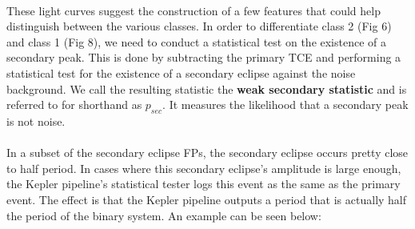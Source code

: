 \documentclass{article}
\begin{document}
\paragraph{}These light curves suggest the construction of a few features that could help distinguish between the various classes. In order to differentiate class 2 (Fig 6) and class 1 (Fig 8), we need to conduct a statistical test on the existence of a secondary peak. This is done by subtracting the primary TCE and performing a statistical test for the existence of a secondary eclipse against the noise background. We call the resulting statistic the \textbf{weak secondary statistic} and is referred to for shorthand as $p_{sec}$. It measures the likelihood that a secondary peak is not noise.

\paragraph{} In a subset of the secondary eclipse FPs, the secondary eclipse occurs pretty close to half period. In cases where this secondary eclipse's amplitude is large enough, the Kepler pipeline's statistical tester logs this event as the same as the primary event. The effect is that the Kepler pipeline outputs a period that is actually half the period of the binary system. An example can be seen below:
\end{document}
